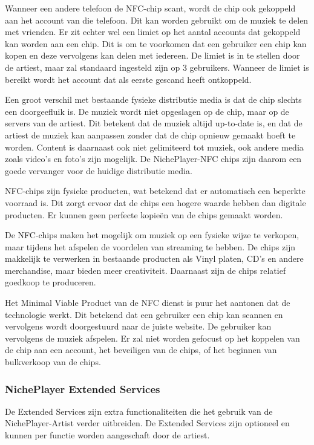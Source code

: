 Wanneer een andere telefoon de NFC-chip scant, wordt de chip ook gekoppeld aan het account van die telefoon. Dit kan worden gebruikt om de muziek te delen met vrienden. Er zit echter wel een limiet op het aantal accounts dat gekoppeld kan worden aan een chip. Dit is om te voorkomen dat een gebruiker een chip kan kopen en deze vervolgens kan delen met iedereen. De limiet is in te stellen door de artiest, maar zal standaard ingesteld zijn op 3 gebruikers. Wanneer de limiet is bereikt wordt het account dat als eerste gescand heeft ontkoppeld.

Een groot verschil met bestaande fysieke distributie media is dat de chip slechts een doorgeefluik is. De muziek wordt niet opgeslagen op de chip, maar op de servers van de artiest. Dit betekent dat de muziek altijd up-to-date is, en dat de artiest de muziek kan aanpassen zonder dat de chip opnieuw gemaakt hoeft te worden. Content is daarnaast ook niet gelimiteerd tot muziek, ook andere media zoals video's en foto's zijn mogelijk. De NichePlayer-NFC chips zijn daarom een goede vervanger voor de huidige distributie media.

NFC-chips zijn fysieke producten, wat betekend dat er automatisch een beperkte voorraad is. Dit zorgt ervoor dat de chips een hogere waarde hebben dan digitale producten. Er kunnen geen perfecte kopieën van de chips gemaakt worden.

De NFC-chips maken het mogelijk om muziek op een fysieke wijze te verkopen, maar tijdens het afspelen de voordelen van streaming te hebben. De chips zijn makkelijk te verwerken in bestaande producten als Vinyl platen, CD's en andere merchandise, maar bieden meer creativiteit. Daarnaast zijn de chips relatief goedkoop te produceren.

Het Minimal Viable Product van de NFC dienst is puur het aantonen dat de technologie werkt. Dit betekend dat een gebruiker een chip kan scannen en vervolgens wordt doorgestuurd naar de juiste website. De gebruiker kan vervolgens de muziek afspelen. Er zal niet worden gefocust op het koppelen van de chip aan een account, het beveiligen van de chips, of het beginnen van bulkverkoop van de chips.

\subsubsection*{NichePlayer Extended Services}
De Extended Services zijn extra functionaliteiten die het gebruik van de NichePlayer-Artist verder uitbreiden. De Extended Services zijn optioneel en kunnen per functie worden aangeschaft door de artiest.

